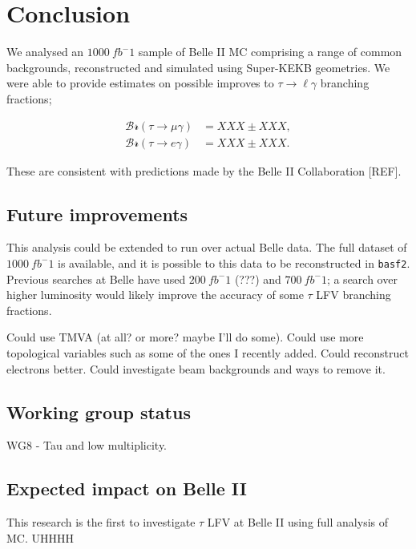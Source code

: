 \documentclass[12pt]{thesis}  %
\begin{document}
\pagebreak


\chapter{Conclusion}

We analysed an $\SI{1000}{fb^-1}$ sample of Belle II MC comprising a range of common backgrounds, reconstructed and simulated using Super-KEKB geometries. We were able to provide estimates on possible improves to $\tau\to\ell\gamma$ branching fractions;

\begin{align}
\mathcal{Br}(\tau\to\mu\gamma) &= XXX \pm XXX,\\
\mathcal{Br}(\tau\to e\gamma) &= XXX \pm XXX.
\end{align}

These are consistent with predictions made by the Belle II Collaboration [REF].


\section{Future improvements}

This analysis could be extended to run over actual Belle data. The full dataset of $\SI{1000}{fb^-1}$ is available, and it is possible to this data to be reconstructed in \texttt{basf2}. Previous searches at Belle have used $\SI{200}{fb^-1}$ (???) and $\SI{700}{fb^-1}$; a search over higher luminosity would likely improve the accuracy of some $\tau$ LFV branching fractions.

Could use TMVA (at all? or more? maybe I'll do some). Could use more topological variables such as some of the ones I recently added. Could reconstruct electrons better. Could investigate beam backgrounds and ways to remove it.

\section{Working group status}

WG8 - Tau and low multiplicity.

\section{Expected impact on Belle II}

This research is the first to investigate $\tau$ LFV at Belle II using full analysis of MC. UHHHH
\end{document}

